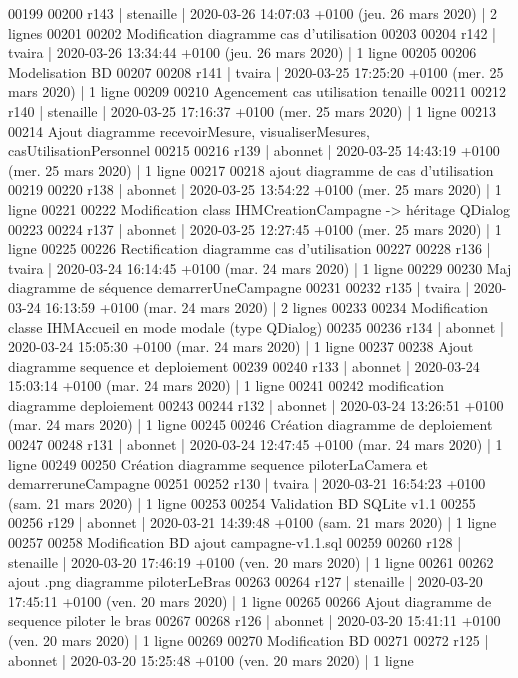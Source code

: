 \begin{DoxyCode}
00199 
00200 r143 | stenaille | 2020-03-26 14:07:03 +0100 (jeu. 26 mars 2020) | 2 lignes
00201 
00202 Modification diagramme cas d'utilisation
00203 
00204 r142 | tvaira | 2020-03-26 13:34:44 +0100 (jeu. 26 mars 2020) | 1 ligne
00205 
00206 Modelisation BD
00207 
00208 r141 | tvaira | 2020-03-25 17:25:20 +0100 (mer. 25 mars 2020) | 1 ligne
00209 
00210 Agencement cas utilisation tenaille
00211 
00212 r140 | stenaille | 2020-03-25 17:16:37 +0100 (mer. 25 mars 2020) | 1 ligne
00213 
00214 Ajout diagramme recevoirMesure, visualiserMesures, casUtilisationPersonnel
00215 
00216 r139 | abonnet | 2020-03-25 14:43:19 +0100 (mer. 25 mars 2020) | 1 ligne
00217 
00218 ajout diagramme de cas d'utilisation
00219 
00220 r138 | abonnet | 2020-03-25 13:54:22 +0100 (mer. 25 mars 2020) | 1 ligne
00221 
00222 Modification class IHMCreationCampagne -> héritage QDialog
00223 
00224 r137 | abonnet | 2020-03-25 12:27:45 +0100 (mer. 25 mars 2020) | 1 ligne
00225 
00226 Rectification diagramme cas d'utilisation
00227 
00228 r136 | tvaira | 2020-03-24 16:14:45 +0100 (mar. 24 mars 2020) | 1 ligne
00229 
00230 Maj diagramme de séquence demarrerUneCampagne
00231 
00232 r135 | tvaira | 2020-03-24 16:13:59 +0100 (mar. 24 mars 2020) | 2 lignes
00233 
00234 Modification classe IHMAccueil en mode modale (type QDialog)
00235 
00236 r134 | abonnet | 2020-03-24 15:05:30 +0100 (mar. 24 mars 2020) | 1 ligne
00237 
00238 Ajout diagramme sequence et deploiement
00239 
00240 r133 | abonnet | 2020-03-24 15:03:14 +0100 (mar. 24 mars 2020) | 1 ligne
00241 
00242 modification diagramme deploiement
00243 
00244 r132 | abonnet | 2020-03-24 13:26:51 +0100 (mar. 24 mars 2020) | 1 ligne
00245 
00246 Création diagramme de deploiement
00247 
00248 r131 | abonnet | 2020-03-24 12:47:45 +0100 (mar. 24 mars 2020) | 1 ligne
00249 
00250 Création diagramme sequence piloterLaCamera et demarreruneCampagne
00251 
00252 r130 | tvaira | 2020-03-21 16:54:23 +0100 (sam. 21 mars 2020) | 1 ligne
00253 
00254 Validation BD SQLite v1.1
00255 
00256 r129 | abonnet | 2020-03-21 14:39:48 +0100 (sam. 21 mars 2020) | 1 ligne
00257 
00258 Modification BD ajout campagne-v1.1.sql
00259 
00260 r128 | stenaille | 2020-03-20 17:46:19 +0100 (ven. 20 mars 2020) | 1 ligne
00261 
00262 ajout .png diagramme piloterLeBras
00263 
00264 r127 | stenaille | 2020-03-20 17:45:11 +0100 (ven. 20 mars 2020) | 1 ligne
00265 
00266 Ajout diagramme de sequence piloter le bras
00267 
00268 r126 | abonnet | 2020-03-20 15:41:11 +0100 (ven. 20 mars 2020) | 1 ligne
00269 
00270 Modification BD
00271 
00272 r125 | abonnet | 2020-03-20 15:25:48 +0100 (ven. 20 mars 2020) | 1 ligne

\end{DoxyCode}
